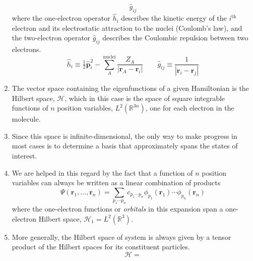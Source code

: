 \begin{enumerate}
\begin{equation}
            \hat{g}_{ij}
        \end{equation}
        where the one-electron operator
        \(
            \hat{h}_i
        \)
        describes the kinetic energy of the \(i^\text{th}\) electron and its
        electrostatic attraction to the nuclei (Coulomb's law), and the
        two-electron operator
        \(
            \hat{g}_{ij}
        \)
        describes the Coulombic repulsion between two electrons.
        \begin{equation}
            \hat{h}_i
            \equiv
            \tfrac{1}{2}
            \hat{\mathbf{p}}_i^2
            -
            \sum_A^\text{nuclei}
            \frac{Z_A}{|\mathbf{r}_A - \mathbf{r}_i|}
            \qquad
            \hat{g}_{ij}
            \equiv
            \frac{1}{|\mathbf{r}_i - \mathbf{r}_j|}
        \end{equation}
    \item
        The vector space containing the eigenfunctions of a given Hamiltonian is
        the Hilbert space, \(\mathcal{H}\), which in this case is the space of
        square integrable functions of \(n\) position variables,
        \(
            L^2(\mathbb{R}^{3n})
        \),
        one for each electron in the molecule.
    \item
        Since this space is infinite-dimensional, the only way to make progress
        in most cases is to determine a basis that approximately spans the
        states of interest.
    \item
        We are helped in this regard by the fact that a function of \(n\)
        position variables can always be written as a linear combination of
        products
        \begin{equation}
            \Psi(\mathbf{r}_1, \dots, \mathbf{r}_n)
            =
            \sum_{p_1\cdots p_n}
            c_{p_1\cdots p_n}
            \phi_{p_1}(\mathbf{r}_1)
            \cdots
            \phi_{p_n}(\mathbf{r}_n)
        \end{equation}
        where the one-electron functions or {\itshape orbitals} in this
        expansion span a one-electron Hilbert space,
        \(
            \mathcal{H}_1
            =
            L^2(\mathbb{R}^3)
        \).
    \item
        More generally, the Hilbert space of system is always given by a tensor
        product of the Hilbert spaces for its constituent particles.
        \begin{equation}
            \mathcal{H}
            =

\end{equation}
\end{enumerate}
